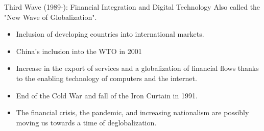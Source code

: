 \documentclass{beamer}
\begin{document}
\begin{frame}{Third Wave (1989-): Financial Integration and Digital Technology}
    Also called the "New Wave of Globalization". \\
    \begin{itemize}
        \item Inclusion of developing countries into international markets.
        \item China's inclusion into the WTO in 2001
        \item Increase in the export of services and a globalization of financial flows thanks to the enabling technology of computers and the internet. %
        \item End of the Cold War and fall of the Iron Curtain in 1991. %
        \item The financial crisis, the pandemic, and increasing nationalism are possibly moving us towards a time of deglobalization. %

\end{itemize}
\end{frame}
\end{document}
